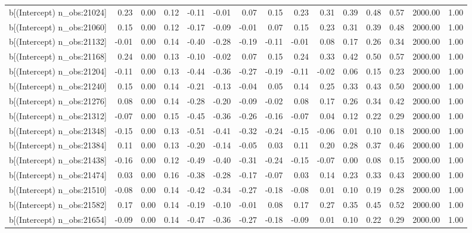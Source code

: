 \begin{table}[ht]
\begin{tabular}{rrrrrrrrrrrrrrr}
  b[(Intercept) n\_obs:21024] & 0.23 & 0.00 & 0.12 & -0.11 & -0.01 & 0.07 & 0.15 & 0.23 & 0.31 & 0.39 & 0.48 & 0.57 & 2000.00 & 1.00 \\ 
  b[(Intercept) n\_obs:21060] & 0.15 & 0.00 & 0.12 & -0.17 & -0.09 & -0.01 & 0.07 & 0.15 & 0.23 & 0.31 & 0.39 & 0.48 & 2000.00 & 1.00 \\ 
  b[(Intercept) n\_obs:21132] & -0.01 & 0.00 & 0.14 & -0.40 & -0.28 & -0.19 & -0.11 & -0.01 & 0.08 & 0.17 & 0.26 & 0.34 & 2000.00 & 1.00 \\ 
  b[(Intercept) n\_obs:21168] & 0.24 & 0.00 & 0.13 & -0.10 & -0.02 & 0.07 & 0.15 & 0.24 & 0.33 & 0.42 & 0.50 & 0.57 & 2000.00 & 1.00 \\ 
  b[(Intercept) n\_obs:21204] & -0.11 & 0.00 & 0.13 & -0.44 & -0.36 & -0.27 & -0.19 & -0.11 & -0.02 & 0.06 & 0.15 & 0.23 & 2000.00 & 1.00 \\ 
  b[(Intercept) n\_obs:21240] & 0.15 & 0.00 & 0.14 & -0.21 & -0.13 & -0.04 & 0.05 & 0.14 & 0.25 & 0.33 & 0.43 & 0.50 & 2000.00 & 1.00 \\ 
  b[(Intercept) n\_obs:21276] & 0.08 & 0.00 & 0.14 & -0.28 & -0.20 & -0.09 & -0.02 & 0.08 & 0.17 & 0.26 & 0.34 & 0.42 & 2000.00 & 1.00 \\ 
  b[(Intercept) n\_obs:21312] & -0.07 & 0.00 & 0.15 & -0.45 & -0.36 & -0.26 & -0.16 & -0.07 & 0.04 & 0.12 & 0.22 & 0.29 & 2000.00 & 1.00 \\ 
  b[(Intercept) n\_obs:21348] & -0.15 & 0.00 & 0.13 & -0.51 & -0.41 & -0.32 & -0.24 & -0.15 & -0.06 & 0.01 & 0.10 & 0.18 & 2000.00 & 1.00 \\ 
  b[(Intercept) n\_obs:21384] & 0.11 & 0.00 & 0.13 & -0.20 & -0.14 & -0.05 & 0.03 & 0.11 & 0.20 & 0.28 & 0.37 & 0.46 & 2000.00 & 1.00 \\ 
  b[(Intercept) n\_obs:21438] & -0.16 & 0.00 & 0.12 & -0.49 & -0.40 & -0.31 & -0.24 & -0.15 & -0.07 & 0.00 & 0.08 & 0.15 & 2000.00 & 1.00 \\ 
  b[(Intercept) n\_obs:21474] & 0.03 & 0.00 & 0.16 & -0.38 & -0.28 & -0.17 & -0.07 & 0.03 & 0.14 & 0.23 & 0.33 & 0.43 & 2000.00 & 1.00 \\ 
  b[(Intercept) n\_obs:21510] & -0.08 & 0.00 & 0.14 & -0.42 & -0.34 & -0.27 & -0.18 & -0.08 & 0.01 & 0.10 & 0.19 & 0.28 & 2000.00 & 1.00 \\ 
  b[(Intercept) n\_obs:21582] & 0.17 & 0.00 & 0.14 & -0.19 & -0.10 & -0.01 & 0.08 & 0.17 & 0.27 & 0.35 & 0.45 & 0.52 & 2000.00 & 1.00 \\ 
  b[(Intercept) n\_obs:21654] & -0.09 & 0.00 & 0.14 & -0.47 & -0.36 & -0.27 & -0.18 & -0.09 & 0.01 & 0.10 & 0.22 & 0.29 & 2000.00 & 1.00 \\ 

\end{tabular}
\end{table}
